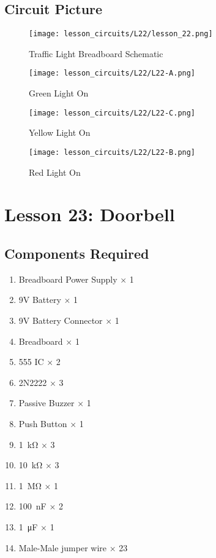 \subsection{Circuit Picture}
\begin{figure}[!h]
    \centering
    \texttt{[image: lesson\_circuits/L22/lesson\_22.png]}
    \caption{Traffic Light Breadboard Schematic}
    \label{fig:555_trlight_sch}
\end{figure}
\begin{figure}[!h]
    \centering
    \texttt{[image: lesson\_circuits/L22/L22-A.png]}
    \caption{Green Light On}
    \label{fig:555_trlight_obb}
\end{figure}
\begin{figure}[!h]
    \centering
    \texttt{[image: lesson\_circuits/L22/L22-C.png]}
    \caption{Yellow Light On}
    \label{fig:555_trlight_obb1}
\end{figure}
\begin{figure}[!h]
    \centering
    \texttt{[image: lesson\_circuits/L22/L22-B.png]}
    \caption{Red Light On}
    \label{fig:555_trlight_obb2}
\end{figure}
\section{Lesson 23: Doorbell}
\subsection{Components Required}
\begin{enumerate}
    \item Breadboard Power Supply $\times$ 1
    \item 9V Battery $\times$ 1
    \item 9V Battery Connector $\times$ 1
    \item Breadboard $\times$ 1
    \item 555 IC $\times$ 2
    \item 2N2222 $\times$ 3
    \item Passive Buzzer $\times$ 1
    \item Push Button $\times$ 1
    \item \SI{1}{\kilo\ohm} $\times$ 3
    \item \SI{10}{\kilo\ohm} $\times$ 3
    \item \SI{1}{\Mohm} $\times$ 1
    \item \SI{100}{\nano\farad} $\times$ 2
    \item \SI{1}{\micro\farad} $\times$ 1
    \item Male-Male jumper wire $\times$ 23
\end{enumerate}

